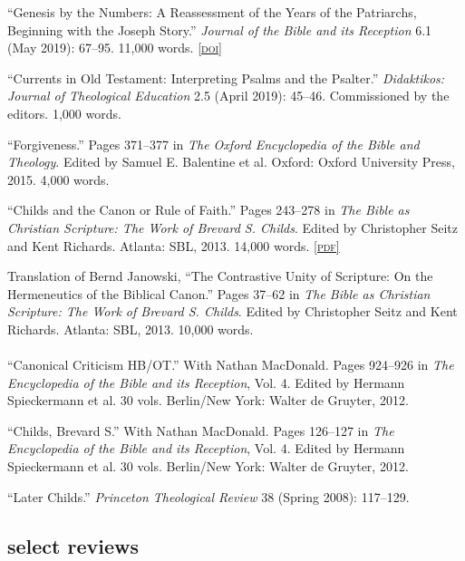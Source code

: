 \documentclass[11pt]{article}
\newcommand{\pdf}[1]{\href{#1}{\footnotesize\textsc{[pdf]}}}
\newcommand{\doi}[1]{\href{https://doi.org/#1}{\footnotesize\textsc{[doi]}}}
\newcommand{\years}[1]{\marginnote{\footnotesize #1}}
\begin{document}
\years{2019}
``Genesis by the Numbers: A Reassessment of the Years of the Patriarchs,
Beginning with the Joseph Story.'' \emph{Journal of the Bible and its
Reception} 6.1 (May 2019): 67–95. 11,000 words.
\doi{10.1515/jbr-2019-1003}

\years{2019}
``Currents in Old Testament: Interpreting Psalms and the Psalter.''
\emph{Didaktikos: Journal of Theological Education} 2.5 (April 2019):
45–46. Commissioned by the editors. 1,000 words.

\years{2015}
``Forgiveness.'' Pages 371--377 in \emph{The Oxford Encyclopedia of the
Bible and Theology}. Edited by Samuel E. Balentine et al. Oxford: Oxford
University Press, 2015. 4,000 words.

\years{2013}
``Childs and the Canon or Rule of Faith.'' Pages 243--278 in \emph{The
Bible as Christian Scripture: The Work of Brevard S. Childs}. Edited by
Christopher Seitz and Kent Richards. Atlanta: SBL, 2013. 14,000 words.
\pdf{http://danieldriver.com/assets/pdf/publications/Driver_2013.pdf}

\years{2013}
Translation of Bernd Janowski, ``The Contrastive Unity of Scripture: On
the Hermeneutics of the Biblical Canon.'' Pages 37--62 in \emph{The
Bible as Christian Scripture: The Work of Brevard S. Childs}. Edited by
Christopher Seitz and Kent Richards. Atlanta: SBL, 2013. 10,000 words.
\\\\%

\years{2012}%
``Canonical Criticism HB/OT.'' With Nathan MacDonald. Pages 924–926 in
\emph{The Encyclopedia of the Bible and its Reception}, Vol. 4. Edited
by Hermann Spieckermann et al. 30 vols. Berlin/New York: Walter de
Gruyter, 2012.

\years{2012}
``Childs, Brevard S.'' With Nathan MacDonald. Pages 126–127 in \emph{The
Encyclopedia of the Bible and its Reception}, Vol. 4. Edited by Hermann
Spieckermann et al. 30 vols. Berlin/New York: Walter de Gruyter, 2012.

\years{2008}
``Later Childs.'' \emph{Princeton Theological Review} 38 (Spring 2008):
117--129.


\subsection*{select reviews}
\end{document}
